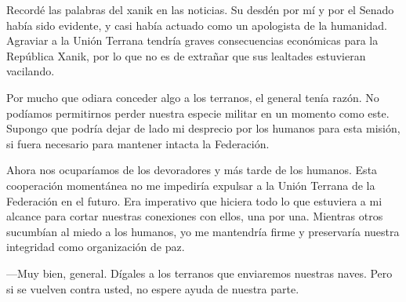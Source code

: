 Recordé las palabras del xanik en las noticias. Su desdén por mí y por el Senado había sido evidente, y casi había actuado como un apologista de la humanidad. Agraviar a la Unión Terrana tendría graves consecuencias económicas para la República Xanik, por lo que no es de extrañar que sus lealtades estuvieran vacilando.

Por mucho que odiara conceder algo a los terranos, el general tenía razón. No podíamos permitirnos perder nuestra especie militar en un momento como este. Supongo que podría dejar de lado mi desprecio por los humanos para esta misión, si fuera necesario para mantener intacta la Federación.

Ahora nos ocuparíamos de los devoradores y más tarde de los humanos. Esta cooperación momentánea no me impediría expulsar a la Unión Terrana de la Federación en el futuro. Era imperativo que hiciera todo lo que estuviera a mi alcance para cortar nuestras conexiones con ellos, una por una. Mientras otros sucumbían al miedo a los humanos, yo me mantendría firme y preservaría nuestra integridad como organización de paz.

—Muy bien, general. Dígales a los terranos que enviaremos nuestras naves. Pero si se vuelven contra usted, no espere ayuda de nuestra parte.
